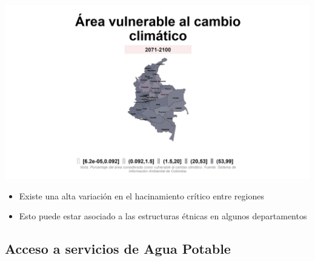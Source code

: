 \documentclass[aspectratio=169]{beamer}
\begin{document}
    \begin{slide}{6} 
                      \begin{imagecolumn}
                \includegraphics[width=\columnwidth]{img/var_299_map.png}
            \end{imagecolumn}
            \begin{textcolumn}
                \begin{itemize}
                    \item Existe una alta variación en el hacinamiento crítico entre regiones 
                    \item Esto puede estar asociado a las estructuras étnicas en algunos departamentos
                \end{itemize}
            \end{textcolumn}

    \printcolumns
    \end{slide}
    
    
        
    \subsection{Acceso a servicios de Agua Potable}
    
\end{document}
